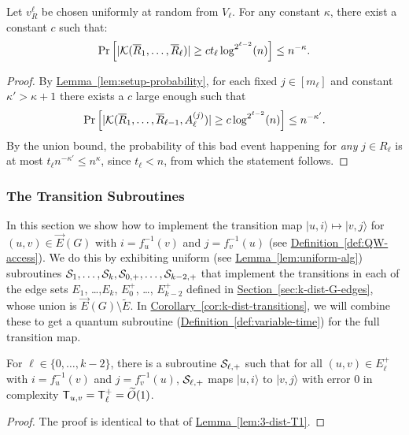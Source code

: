 \documentclass{article}
\renewcommand{\sec}[1]{\hyperref[sec:#1]{Section~\ref*{sec:#1}}}
\newcommand{\lem}[1]{\hyperref[lem:#1]{Lemma~\ref*{lem:#1}}}
\newcommand{\cor}[1]{\hyperref[cor:#1]{Corollary~\ref*{cor:#1}}}
\newcommand{\defin}[1]{\hyperref[def:#1]{Definition~\ref*{def:#1}}}
\def\ket#1{{\lvert}#1\rangle}
\renewcommand{\>}{\rangle}
\newcommand{\<}{\langle}
\renewcommand{\(}{\left(}
\renewcommand{\)}{\right)}
\begin{document}
\begin{corollary}\label{cor:col-prob}
Let $v_{R}^{\ell}$ be chosen uniformly at random from $V_{\ell}$. 
	For any constant $\kappa$, there exist a constant $c$ such that:
	$$\Pr\left[|{\cal K}(\overline{R}_1,\dots,\overline{R}_{\ell})|\geq ct_{\ell}\log^{2^{\ell-2}}(n)\right]\leq n^{-\kappa}.$$
\end{corollary}
\begin{proof}
	By \lem{setup-probability}, for each fixed $j \in [m_{\ell}]$ and constant $\kappa'>\kappa+1$ there exists a $c$ large enough such that
	$$\Pr\left[ |{\cal K}(\overline{R}_1,\dots,\overline{R}_{\ell-1},A_{\ell}^{(j)})|\geq c\log^{2^{\ell-2}}(n)\right]\leq {n^{-\kappa'}}.$$
By the union bound, the probability of this bad event happening for \emph{any} $j\in R_{\ell}$ is at most $t_{\ell} n^{-\kappa'}\leq n^{\kappa}$, since $t_{\ell}<n$, from which the statement follows.
\end{proof}





\subsubsection{The Transition Subroutines}\label{sec:k-dist-transitions}

In this section we show how to implement the transition map  $\ket{u,i}{\mapsto}\ket{v,j}$ for $(u,v)\in\overrightarrow{E}(G)$ with $i=f_u^{-1}(v)$ and $j=f_v^{-1}(u)$ (see \defin{QW-access}). We do this by exhibiting uniform (see \lem{uniform-alg}) subroutines ${\cal S}_1,\dots,{\cal S}_k,{\cal S}_{0,+},\dots,{\cal S}_{k-2,+}$ that implement the transitions in each of the edge sets $E_1$, \dots ,$E_k$, $E_0^+$, \dots, $E_{k-2}^+$ defined in \sec{k-dist-G-edges}, whose union is $\overrightarrow{E}(G)\setminus \tilde{E}$. In \cor{k-dist-transitions}, we will combine these to get a quantum subroutine (\defin{variable-time}) for the full transition map. 

\begin{lemma}\label{lem:k-dist-T1}
For $\ell \in \{0,\dots,k-2\}$, there is a subroutine ${\cal S}_{\ell,+}$ such that for all $(u,v)\in E_{\ell}^+$ with $i=f_u^{-1}(v)$ and $j=f_v^{-1}(u)$, ${\cal S}_{\ell,+}$ maps $\ket{u,i}$ to $\ket{v,j}$ with error 0 in complexity ${\sf T}_{u,v}={\sf T}_{\ell}^+=\widetilde{O}(1)$.
\end{lemma}
\begin{proof} The proof is identical to that of \lem{3-dist-T1}.\end{proof}
\end{document}
